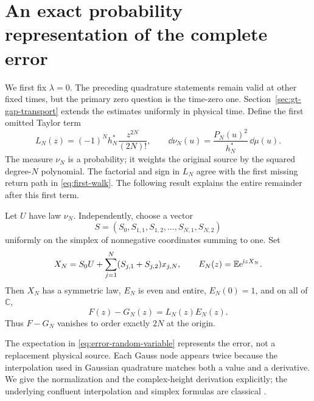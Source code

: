 \section{An exact probability representation of the complete error}
\label{sec:error-law}

We first fix \(\lambda=0\). The preceding quadrature statements
remain valid at other fixed times, but the primary zero question is
the time-zero one. Section~\ref{sec:gt-gap-transport} extends the estimates
uniformly in physical time. Define the first omitted Taylor term
\begin{equation}
 L_N(z)=(-1)^N h_N^*\frac{z^{2N}}{(2N)!},\qquad
 \dd\nu_N(u)=\frac{P_N(u)^2}{h_N^*}\,\dd\mu(u).
 \label{eq:leading-error}
\end{equation}
The measure \(\nu_N\) is a probability; it weights the original
source by the squared degree-\(N\) polynomial. The factorial and sign
in \(L_N\) agree with the first missing return path in
\eqref{eq:first-walk}. The following result explains the entire
remainder after this first term.

\begin{theorem}
\label{thm:error-law}
Let \(U\) have law \(\nu_N\). Independently, choose a vector
\[
 S=(S_0,S_{1,1},S_{1,2},\ldots,S_{N,1},S_{N,2})
\]
uniformly on the simplex of nonnegative coordinates summing to one. Set
\begin{equation}
 X_N=S_0U+\sum_{j=1}^N(S_{j,1}+S_{j,2})x_{j,N},\qquad
 E_N(z)=\mathbb E\mathrm e^{\mathrm i zX_N}.
 \label{eq:error-random-variable}
\end{equation}
Then \(X_N\) has a symmetric law, \(E_N\) is even and entire,
\(E_N(0)=1\), and on all of \(\mathbb C\),
\begin{equation}
 \boxed{F(z)-G_N(z)=L_N(z)E_N(z).}
 \label{eq:error-factorization}
\end{equation}
Thus \(F-G_N\) vanishes to order exactly \(2N\) at the origin.
\end{theorem}

The expectation in \eqref{eq:error-random-variable} represents the
error, not a replacement physical source. Each Gauss node appears
twice because the interpolation used in Gaussian quadrature matches
both a value and a derivative. We give the normalization and the
complex-height derivation explicitly; the underlying confluent
interpolation and simplex formulas are classical
\cite[\S1, Eq.~(16); \S7, Definition~37; \S9, Eq.~(52)]{deboor}.


